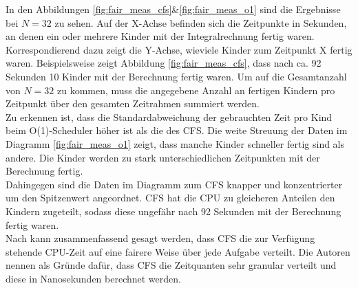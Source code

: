 In den Abbildungen \ref{fig:fair_meas_cfs}\&\ref{fig:fair_meas_o1} sind die Ergebnisse bei $N=32$ zu sehen. Auf der X-Achse befinden sich die Zeitpunkte in Sekunden, an denen ein oder mehrere Kinder mit der Integralrechnung fertig waren. Korrespondierend dazu zeigt die Y-Achse, wieviele Kinder zum Zeitpunkt X fertig waren. Beispielsweise zeigt Abbildung \ref{fig:fair_meas_cfs}, dass nach ca. 92 Sekunden 10 Kinder mit der Berechnung fertig waren. Um auf die Gesamtanzahl von $N=32$ zu kommen, muss die angegebene Anzahl an fertigen Kindern pro Zeitpunkt über den gesamten Zeitrahmen summiert werden. \\
Zu erkennen ist, dass die Standardabweichung der gebrauchten Zeit pro Kind beim O(1)-Scheduler höher ist als die des CFS. Die weite Streuung der Daten im Diagramm \ref{fig:fair_meas_o1} zeigt, dass manche Kinder schneller fertig sind als andere. Die Kinder werden zu stark unterschiedlichen Zeitpunkten mit der Berechnung fertig.\\
Dahingegen sind die Daten im Diagramm zum CFS knapper und konzentrierter um den Spitzenwert angeordnet. CFS hat die CPU zu gleicheren Anteilen den Kindern zugeteilt, sodass diese ungefähr nach 92 Sekunden mit der Berechnung fertig waren. \\
Nach \cite{papercomparison} kann zusammenfassend gesagt werden, dass CFS die zur Verfügung stehende CPU-Zeit auf eine fairere Weise über jede Aufgabe verteilt. Die Autoren nennen als Grün\-de dafür, dass CFS die Zeitquanten sehr granular verteilt und diese in Nanosekunden berechnet werden.

